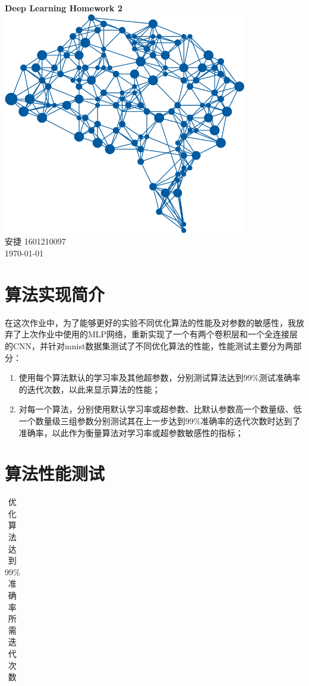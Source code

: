 \documentclass[a4paper, UTF8]{ctexrep}
\begin{document}
	\begin{titlepage}
		\centering
		\vspace{6cm}
		\LARGE{\textbf{Deep Learning Homework 2}}\\
		\vspace{4cm}
		\includegraphics[width=0.8\textwidth]{deepLearning.png}\\
		\vspace{4cm}
		\normalsize{安捷 1601210097}\\
		\normalsize{\today}
	\end{titlepage}
		\section{算法实现简介}
			在这次作业中，为了能够更好的实验不同优化算法的性能及对参数的敏感性，我放弃了上次作业中使用的MLP网络，重新实现了一个有两个卷积层和一个全连接层的CNN，并针对mnist数据集测试了不同优化算法的性能，性能测试主要分为两部分：
			\begin{enumerate}
				\item 使用每个算法默认的学习率及其他超参数，分别测试算法达到99\%测试准确率的迭代次数，以此来显示算法的性能；
				\item 对每一个算法，分别使用默认学习率或超参数、比默认参数高一个数量级、低一个数量级三组参数分别测试其在上一步达到99\%准确率的迭代次数时达到了准确率，以此作为衡量算法对学习率或超参数敏感性的指标；
			\end{enumerate}
		\section{算法性能测试}
			\begin{table}[htbp!]
				\centering
				\begin{tabular}{ccc}

				\end{tabular}
				\caption{优化算法达到99\%准确率所需迭代次数}
			\end{table}
\end{document}
